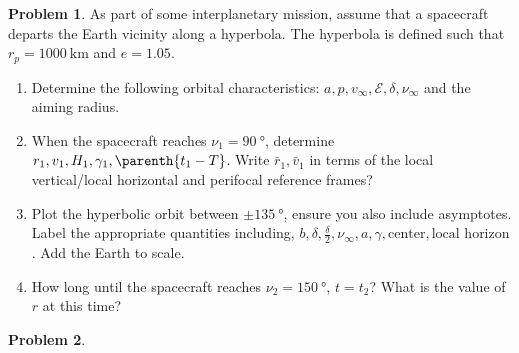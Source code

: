 \documentclass[10pt]{article}
\theoremstyle{definition}
\newtheorem{prob}{Problem}[section]
\newenvironment{subprob}%
{\renewcommand{\theenumi}{\alph{enumi}}\renewcommand{\labelenumi}{(\theenumi)}\begin{enumerate}}%
{\end{enumerate}}%
\begin{document}
\begin{prob}
    As part of some interplanetary mission, assume that a spacecraft departs the Earth vicinity along a hyperbola.
    The hyperbola is defined such that \( r_p = \SI{1000}{\kilo\meter} \) and \( e  = 1.05\).

    \begin{subprob}
        \item Determine the following orbital characteristics: \( a, p, v_\infty, \mathcal{E}, \delta, \nu_\infty \) and the aiming radius.
        \item When the spacecraft reaches \( \nu_1 = \SI{90}{\degree} \), determine \( r_1, v_1, H_1, \gamma_1, \parenth{t_1 - T } \).
            Write \( \bar r_1, \bar v_1 \) in terms of the local vertical/local horizontal and perifocal reference frames?
        \item Plot the hyperbolic orbit between \( \pm \SI{135}{\degree} \), ensure you also include asymptotes.
            Label the appropriate quantities including, \( b, \delta, \frac{\delta}{2} , \nu_\infty, a, \gamma, \text{center} , \text{local horizon} \).
            Add the Earth to scale.
        \item How long until the spacecraft reaches \( \nu_2 = \SI{150}{\degree} \), \( t = t_2\)?
            What is the value of \( r \) at this time?
    \end{subprob}
\end{prob}

\begin{prob}

\end{prob}
\end{document}
